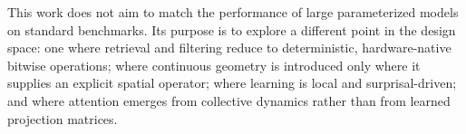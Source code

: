 This work does not aim to match the performance of large parameterized
models on standard benchmarks.  Its purpose is to explore a different
point in the design space: one where retrieval and filtering reduce to
deterministic, hardware-native bitwise operations; where continuous
geometry is introduced only where it supplies an explicit spatial
operator; where learning is local and surprisal-driven; and where
attention emerges from collective dynamics rather than from learned
projection matrices.

